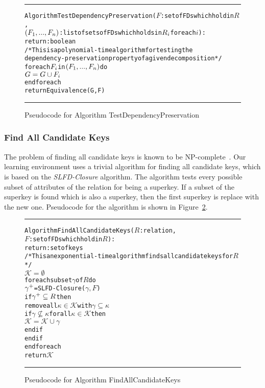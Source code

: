 \begin{figure}[htbp]
\hrule
\vspace{0.25cm}
\begin{alltt}
Algorithm TestDependencyPreservation(\(F\): set of FDs which hold in \(R\),
           \((F\sb{1},...,F\sb{n})\): list of sets of FDs which holds in \(R\sb{i}\) for each \(i\)):
          return: boolean
/* This is a polynomial-time algorithm for testing the 
dependency-preservation property of a given decomposition */
  for each \(F\sb{i}\) in \((F\sb{1},...,F\sb{n})\) do
    \(G = G \cup F\sb{i}\)
  end foreach
  return Equivalence(G,F)
\end{alltt}
\caption{Pseudocode for Algorithm TestDependencyPreservation}\label{fig:dptest}
\hrule
\end{figure}

\subsubsection{Find All Candidate Keys}
The problem of finding all candidate keys is known to be NP-complete~\cite{p3}. 
Our learning environment uses a trivial algorithm for finding all candidate keys,
which is based on the \textit{SLFD-Closure} algorithm. The algorithm tests every possible
subset of attributes of the relation for being a superkey. If a subset of the superkey
is found which is also a superkey, then the first superkey is replace with the new one.  
Pseudocode for the algorithm is shown in Figure~\ref{alg:findkeys}. 

\begin{figure}[htbp]
\hrule
\vspace{0.25cm}
\begin{alltt}
Algorithm FindAllCandidateKeys(\(R\): relation,
              \(F\): set of FDs which hold in \(R\)):
            return: set of keys
/* This an exponential-time algorithm finds all candidate keys for \(R\)*/             
  \(\mathcal{K} = \emptyset\)
  foreach subset \(\gamma\) of \(R\) do
    \(\gamma\sp{+}\) = SLFD-Closure(\(\gamma, F\))
    if \(\gamma\sp{+} \subseteq R\) then
      remove all \(\kappa \in \mathcal{K}\) with  \(\gamma \subseteq \kappa\)
      if \(\gamma \nsubseteq \kappa\) for all \(\kappa \in \mathcal{K}\) then
        \(\mathcal{K} = \mathcal{K} \cup \gamma\)
      end if
    end if
  end foreach
  return \(\mathcal{K}\)
\end{alltt}
\caption{Pseudocode for Algorithm FindAllCandidateKeys}\label{alg:findkeys}
\hrule
\end{figure}

